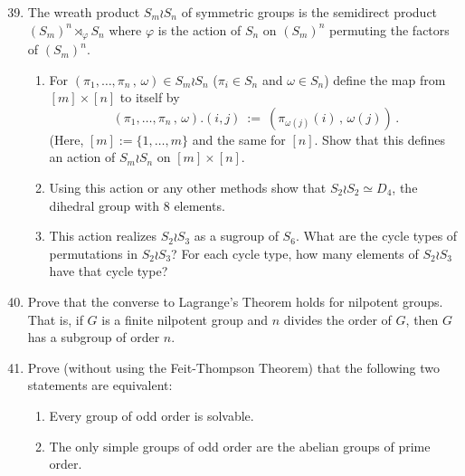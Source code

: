 \documentclass[12pt]{article}
\begin{document}
\normalsize
\begin{enumerate}
\setcounter{enumi}{38}  %
 

%
\item The wreath product $S_m\wr S_n$ of symmetric groups is the semidirect product
       $(S_m)^n\rtimes_\varphi S_n$ where $\varphi$ is the action of $S_n$ on $(S_m)^n$
       permuting the factors of $(S_m)^n$.
   \begin{enumerate}
    \item For $(\pi_1,\dotsc,\pi_n\,,\,\omega)\in S_m\wr S_n$ 
          ($\pi_i\in S_n$ and $\omega\in  S_n$) define the map from 
      $[m]\times [n]$ to itself by 
\[
     (\pi_1,\dotsc,\pi_n\,,\,\omega).(i,j)\ :=\ 
      ( \pi_{\omega(j)}(i)\,,\, \omega(j))\,.
\]
    (Here, $[m]:=\{1,\dotsc,m\}$ and the same for $[n]$.
    Show that this defines an action of $S_m\wr S_n$ on $[m]\times [n]$.
   
    \item Using this action or any other methods show that 
           $S_2\wr S_2\simeq D_4$, the dihedral group with $8$ elements.

    \item This action realizes $S_2\wr S_3$ as a sugroup of $S_6$.
          What are the cycle types of permutations in $S_2\wr S_3$?
          For each cycle type, how many elements of $S_2\wr S_3$ have that cycle type? 
   \end{enumerate}
\vspace{-2pt}


% 
\item  Prove that the converse to Lagrange's Theorem holds for nilpotent groups.
      That is, if $G$ is a finite nilpotent group and $n$ divides the order of $G$, then $G$
      has a subgroup of order $n$.

\vspace{-2pt}

\item
   Prove (without using the Feit-Thompson Theorem) that the following two statements are
   equivalent:
  \begin{enumerate}
   \item Every group of odd order is solvable.
   \item The only simple groups of odd order are the abelian groups of prime order.
  \end{enumerate}\vspace{-2pt}
  


\end{enumerate}
\end{document}

